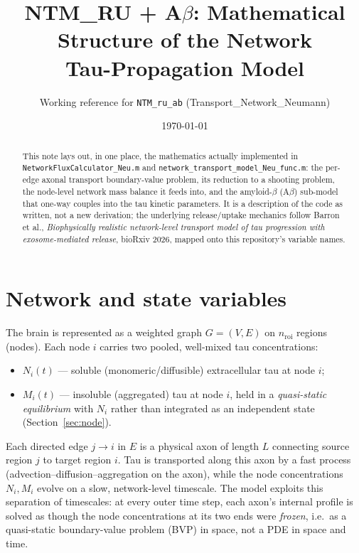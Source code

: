 ﻿\documentclass[11pt]{article}
\title{\textbf{NTM\_RU + A$\beta$: Mathematical Structure of the Network\\ Tau-Propagation Model}}
\author{Working reference for \texttt{NTM\_ru\_ab} (Transport\_Network\_Neumann)}
\date{\today}
\begin{document}
\maketitle

\begin{abstract}
This note lays out, in one place, the mathematics actually implemented in
\texttt{NetworkFluxCalculator\_Neu.m} and \texttt{network\_transport\_model\_Neu\_func.m}:
the per-edge axonal transport boundary-value problem, its reduction to a
shooting problem, the node-level network mass balance it feeds into, and the
amyloid-$\beta$ (A$\beta$) sub-model that one-way couples into the tau kinetic
parameters. It is a description of the code as written, not a new derivation;
the underlying release/uptake mechanics follow Barron et al., \emph{Biophysically
realistic network-level transport model of tau progression with exosome-mediated
release}, bioRxiv 2026, mapped onto this repository's variable names.
\end{abstract}

\tableofcontents

\section{Network and state variables}

The brain is represented as a weighted graph $G=(V,E)$ on $n_{\mathrm{roi}}$
regions (nodes). Each node $i$ carries two pooled, well-mixed tau
concentrations:
\begin{itemize}
  \item $N_i(t)$ --- soluble (monomeric/diffusible) extracellular tau at node $i$;
  \item $M_i(t)$ --- insoluble (aggregated) tau at node $i$, held in a
  \emph{quasi-static equilibrium} with $N_i$ rather than integrated as an
  independent state (Section~\ref{sec:node}).
\end{itemize}
Each directed edge $j \to i$ in $E$ is a physical axon of length $L$
connecting source region $j$ to target region $i$. Tau is transported along
this axon by a fast process (advection--diffusion--aggregation on the axon),
while the node concentrations $N_i, M_i$ evolve on a slow, network-level
timescale. The model exploits this separation of timescales: at every outer
time step, each axon's internal profile is solved as though the node
concentrations at its two ends were \emph{frozen}, i.e.\ as a quasi-static
boundary-value problem (BVP) in space, not a PDE in space and time.
\end{document}
